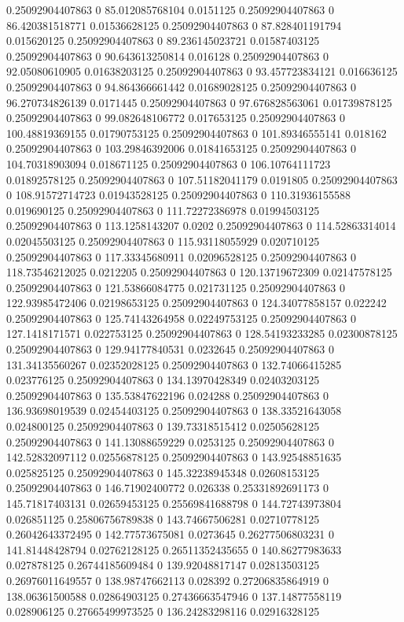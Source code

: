 0.25092904407863 0 85.012085768104 0.0151125
0.25092904407863 0 86.420381518771 0.01536628125
0.25092904407863 0 87.828401191794 0.015620125
0.25092904407863 0 89.236145023721 0.01587403125
0.25092904407863 0 90.643613250814 0.016128
0.25092904407863 0 92.05080610905 0.01638203125
0.25092904407863 0 93.457723834121 0.016636125
0.25092904407863 0 94.864366661442 0.01689028125
0.25092904407863 0 96.270734826139 0.0171445
0.25092904407863 0 97.676828563061 0.01739878125
0.25092904407863 0 99.082648106772 0.017653125
0.25092904407863 0 100.48819369155 0.01790753125
0.25092904407863 0 101.89346555141 0.018162
0.25092904407863 0 103.29846392006 0.01841653125
0.25092904407863 0 104.70318903094 0.018671125
0.25092904407863 0 106.10764111723 0.01892578125
0.25092904407863 0 107.51182041179 0.0191805
0.25092904407863 0 108.91572714723 0.01943528125
0.25092904407863 0 110.31936155588 0.019690125
0.25092904407863 0 111.72272386978 0.01994503125
0.25092904407863 0 113.1258143207 0.0202
0.25092904407863 0 114.52863314014 0.02045503125
0.25092904407863 0 115.93118055929 0.020710125
0.25092904407863 0 117.33345680911 0.02096528125
0.25092904407863 0 118.73546212025 0.0212205
0.25092904407863 0 120.13719672309 0.02147578125
0.25092904407863 0 121.53866084775 0.021731125
0.25092904407863 0 122.93985472406 0.02198653125
0.25092904407863 0 124.34077858157 0.022242
0.25092904407863 0 125.74143264958 0.02249753125
0.25092904407863 0 127.1418171571 0.022753125
0.25092904407863 0 128.54193233285 0.02300878125
0.25092904407863 0 129.94177840531 0.0232645
0.25092904407863 0 131.34135560267 0.02352028125
0.25092904407863 0 132.74066415285 0.023776125
0.25092904407863 0 134.13970428349 0.02403203125
0.25092904407863 0 135.53847622196 0.024288
0.25092904407863 0 136.93698019539 0.02454403125
0.25092904407863 0 138.33521643058 0.024800125
0.25092904407863 0 139.73318515412 0.02505628125
0.25092904407863 0 141.13088659229 0.0253125
0.25092904407863 0 142.52832097112 0.02556878125
0.25092904407863 0 143.92548851635 0.025825125
0.25092904407863 0 145.32238945348 0.02608153125
0.25092904407863 0 146.71902400772 0.026338
0.25331892691173 0 145.71817403131 0.02659453125
0.25569841688798 0 144.72743973804 0.026851125
0.25806756789838 0 143.74667506281 0.02710778125
0.26042643372495 0 142.77573675081 0.0273645
0.26277506803231 0 141.81448428794 0.02762128125
0.26511352435655 0 140.86277983633 0.027878125
0.26744185609484 0 139.92048817147 0.02813503125
0.26976011649557 0 138.98747662113 0.028392
0.27206835864919 0 138.06361500588 0.02864903125
0.27436663547946 0 137.14877558119 0.028906125
0.27665499973525 0 136.24283298116 0.02916328125
